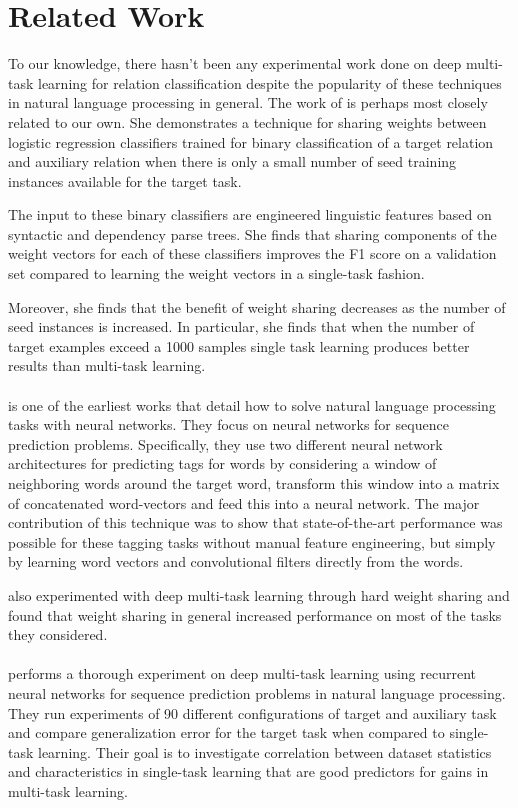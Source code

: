 \section{Related Work}
To our knowledge, there hasn't been any experimental work done on deep multi-task learning for relation classification despite the popularity of these techniques in natural language processing in general. The work of \citet{jiang2009} is perhaps most closely related to our own. She demonstrates a technique for sharing weights between logistic regression classifiers trained for binary classification of a target relation and auxiliary relation when there is only a small number of seed training instances available for the target task. 

The input to these binary classifiers are engineered linguistic features based on syntactic and dependency parse trees. She finds that sharing components of the weight vectors for each of these classifiers improves the F1 score on a validation set compared to learning the weight vectors in a single-task fashion.

Moreover, she finds that the benefit of weight sharing decreases as the number of seed instances is increased. In particular, she finds that when the number of target examples exceed a 1000 samples single task learning produces better results than multi-task learning.
\\\\
\citet{collobert2011} is one of the earliest works that detail how to solve natural language processing tasks with neural networks. They focus on neural networks for sequence prediction problems. Specifically, they use two different neural network architectures for predicting tags for words by considering a window of neighboring words around the target word, transform this window into a matrix of concatenated word-vectors and feed this into a neural network. The major contribution of this technique was to show that state-of-the-art performance was possible for these tagging tasks without manual feature engineering, but simply by learning word vectors and convolutional filters directly from the words.

\citet{collobert2011} also experimented with deep multi-task learning through hard weight sharing and found that weight sharing in general increased performance on most of the tasks they considered.
\\\\
\citet{bingel2017} performs a thorough experiment on deep multi-task learning using recurrent neural networks for sequence prediction problems in natural language processing. They run experiments of 90 different configurations of target and auxiliary task and compare generalization error for the target task when compared to single-task learning. Their goal is to investigate correlation between dataset statistics and characteristics in single-task learning that are good predictors for gains in multi-task learning.

